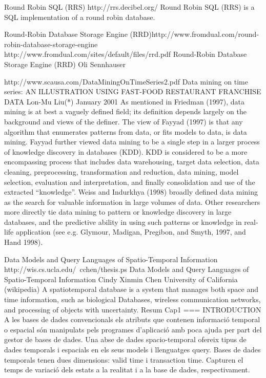 Round Robin SQL (RRS)
​http://rrs.decibel.org/
Round Robin SQL (RRS) is a SQL implementation of a round robin database. 

Round-Robin Database Storage Engine (RRD)
​http://www.fromdual.com/round-robin-database-storage-engine
​http://www.fromdual.com/sites/default/files/rrd.pdf
Round-Robin Database Storage Engine (RRD)
Oli Sennhauser


​http://www.scausa.com/DataMiningOnTimeSeries2.pdf
Data mining on time series:
AN ILLUSTRATION USING FAST-FOOD RESTAURANT FRANCHISE DATA
Lon-Mu Liu(*)
January 2001
As mentioned in Friedman (1997), data
mining is at best a vaguely defined field; its definition depends largely on the background and views
of the definer. The view of Fayyad (1997) is that any algorithm that enumerates patterns from data,
or fits models to data, is data mining. Fayyad further viewed data mining to be a single step in a
larger process of knowledge discovery in databases (KDD). KDD is considered to be a more
encompassing process that includes data warehousing, target data selection, data cleaning,
preprocessing, transformation and reduction, data mining, model selection, evaluation and
interpretation, and finally consolidation and use of the extracted “knowledge”. Weiss and Indurkhya
(1998) broadly defined data mining as the search for valuable information in large volumes of data.
Other researchers more directly tie data mining to pattern or knowledge discovery in large databases,
and the predictive ability in using such patterns or knowledge in real-life application (see e.g.
Glymour, Madigan, Pregibon, and Smyth, 1997, and Hand 1998).


Data Models and Query Languages of Spatio-Temporal Information
​http://wis.cs.ucla.edu/~cchen/thesis.ps
Data Models and Query Languages of Spatio-Temporal Information
Cindy Xinmin Chen
University of California
(wikipedia) A spatiotemporal database is a system that manages both space and time information, such as biological Databases, wireless communication networks, and processing of objects with uncertainty.
Resum
Cap1 
===
INTRODUCTION
A les bases de dades convencionals els atributs que contenen informació temporal o espacial són manipulats pels programes d'aplicació amb poca ajuda per part del gestor de bases de dades. Una abse de dades spacio-temporal ofereix tipus de dades temporals i espacials en els seus models i llenguatges query.
Bases de dades temporals tenen dues dimensions: valid time i transaction time. Capturen el temps de variació dels estats a la realitat i a la base de dades, respectivament.



